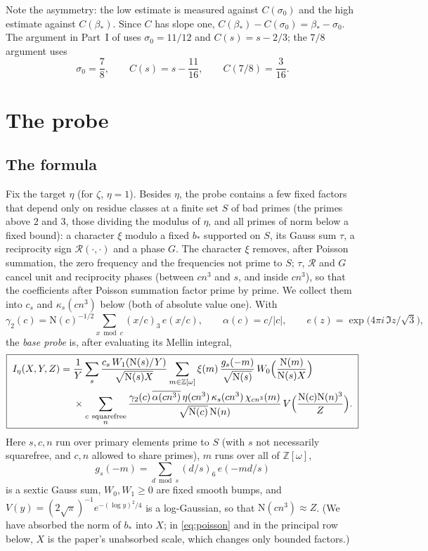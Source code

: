 \documentclass[11pt]{article}
\newcommand{\OO}{\mathbb Z[\omega]}
\newcommand{\N}{\mathrm N}
\begin{document}
Note the asymmetry: the low estimate is measured against $C(\sigma_0)$ and
the high estimate against $C(\beta_*)$. Since $C$ has slope one,
$C(\beta_*)-C(\sigma_0)=\beta_*-\sigma_0$. The argument in Part~I of
\cite{OAI78} uses $\sigma_0=11/12$ and $C(s)=s-2/3$; the $7/8$ argument
uses
\[
 \sigma_0=\frac78,\qquad C(s)=s-\frac{11}{16},\qquad C(7/8)=\frac3{16}.
\]

\section{The probe}\label{sec:probe}

\subsection{The formula}
Fix the target $\eta$ (for $\zeta$, $\eta=1$). Besides $\eta$, the probe
contains a few fixed factors that depend only on residue classes at a finite set $S$ of
bad primes (the primes above $2$ and $3$, those dividing the modulus of $\eta$, and all
primes of norm below a fixed bound): a character $\xi$ modulo a fixed $b_*$ supported on
$S$, its Gauss sum $\tau$, a reciprocity sign $\mathcal R(\cdot,\cdot)$ and a phase $G$.
The character $\xi$ removes, after Poisson summation, the zero frequency and the
frequencies not prime to $S$; $\tau$, $\mathcal R$ and $G$ cancel unit and reciprocity
phases (between $cn^3$ and $s$, and inside $cn^3$), so that the coefficients after Poisson
summation factor prime by prime. We collect them into
$c_s$ and $\kappa_s(cn^3)$ below (both of absolute value one). With
\[
 \gamma_2(c)=\N(c)^{-1/2}\sum_{x\bmod c}(x/c)_3\,e(x/c),\qquad
 \alpha(c)=c/|c|,\qquad
 e(z)=\exp\bigl(4\pi i\,\Im z/\sqrt3\bigr),
\]
the \emph{base probe} \cite[eq.\ general-probe, L3397]{OAI78} is, after
evaluating its Mellin integral,
\begin{equation}\label{eq:probe}
\boxed{\;
\begin{aligned}
 I_\eta(X,Y,Z)={}&\frac1Y\sum_{s}
 \frac{c_s\,W_1(\N(s)/Y)}{\sqrt{\N(s)X}}
 \sum_{m\in\OO}\xi(m)\,
 \frac{g_s(-m)}{\sqrt{\N(s)}}\,
 W_0\Bigl(\frac{\N(m)}{\N(s)X}\Bigr)\\
 &\times\sum_{\substack{c\ \mathrm{squarefree}\\ n}}
 \frac{\gamma_2(c)\,\overline{\alpha(cn^3)}\,\eta(cn^3)\,\kappa_s(cn^3)\,
       \chi_{cn^3}(m)}{\sqrt{\N(c)}\,\N(n)}\,
 V\Bigl(\frac{\N(c)\N(n)^3}Z\Bigr).
\end{aligned}\;}
\end{equation}
Here $s,c,n$ run over primary elements prime to $S$ (with $s$ not
necessarily squarefree, and $c,n$ allowed to share primes), $m$ runs over all of $\OO$,
\[
 g_s(-m)=\sum_{d\bmod s}(d/s)_6\,e(-md/s)
\]
is a sextic Gauss sum, $W_0,W_1\ge0$ are fixed smooth bumps, and
$V(y)=(2\sqrt\pi)^{-1}e^{-(\log y)^2/4}$ is a log-Gaussian, so that
$\N(cn^3)\approx Z$. (We have absorbed the norm of $b_*$ into $X$; in \eqref{eq:poisson} and in the
principal row below, $X$ is the paper's unabsorbed scale, which changes only bounded factors.)
\end{document}
